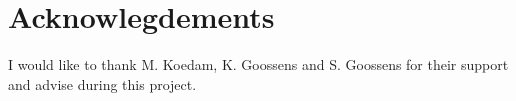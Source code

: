 \section*{Acknowlegdements}
I would like to thank M. Koedam, K. Goossens and S. Goossens for their support and advise during this project. 



